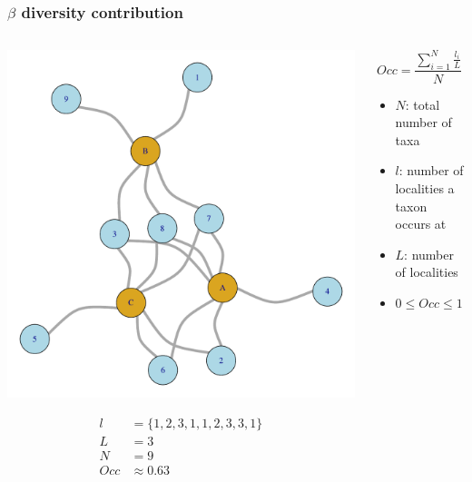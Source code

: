 \documentclass{beamer}
\begin{document}
\begin{frame}
  \frametitle{\(\beta\) diversity contribution}

  \begin{columns}
    \begin{column}{0.6\textwidth}
      \begin{center}
        \includegraphics[height = 0.5\textheight, width = \textwidth, keepaspectratio = true]{figure/sim_graph}

        \begin{align*}
          l &= \{1, 2, 3, 1, 1, 2, 3, 3, 1\}\\
          L &= 3\\
          N &= 9\\
          Occ &\approx 0.63 
        \end{align*}
      \end{center}
    \end{column}
    \begin{column}{0.4\textwidth}
      \[
        Occ = \frac{\sum_{i = 1}^{N} \frac{l_{i}}{L}}{N}
      \]

      \begin{itemize}
        \item \(N\): total number of taxa
        \item \(l\): number of localities a taxon occurs at
        \item \(L\): number of localities
        \item \(0 \leq Occ \leq 1\)
      \end{itemize}
    \end{column}
  \end{columns}
\end{frame}
\end{document}
